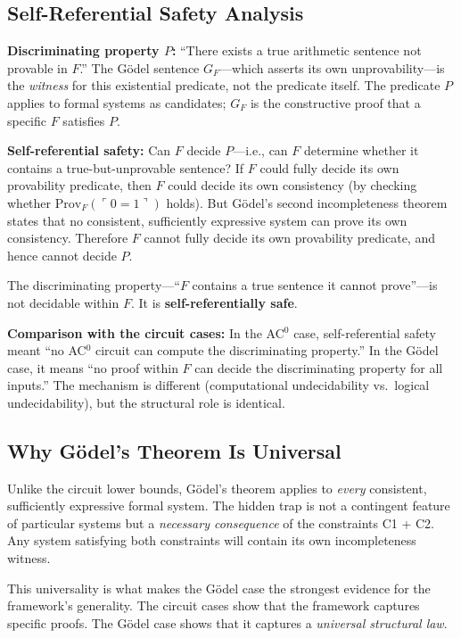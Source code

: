 \documentclass[11pt,a4paper]{article}
\theoremstyle{plain}
\theoremstyle{definition}
\theoremstyle{remark}
\newcommand{\Prov}{\mathrm{Prov}}
\begin{document}
\subsection{Self-Referential Safety Analysis}

\textbf{Discriminating property $P$:} ``There exists a true arithmetic sentence not provable in $F$.'' The G\"{o}del sentence $G_F$---which asserts its own unprovability---is the \emph{witness} for this existential predicate, not the predicate itself. The predicate $P$ applies to formal systems as candidates; $G_F$ is the constructive proof that a specific $F$ satisfies $P$.

\textbf{Self-referential safety:} Can $F$ decide $P$---i.e., can $F$ determine whether it contains a true-but-unprovable sentence? If $F$ could fully decide its own provability predicate, then $F$ could decide its own consistency (by checking whether $\Prov_F(\ulcorner 0=1 \urcorner)$ holds). But G\"{o}del's second incompleteness theorem states that no consistent, sufficiently expressive system can prove its own consistency. Therefore $F$ cannot fully decide its own provability predicate, and hence cannot decide $P$.

The discriminating property---``$F$ contains a true sentence it cannot prove''---is not decidable within $F$. It is \textbf{self-referentially safe}.

\textbf{Comparison with the circuit cases:} In the AC$^0$ case, self-referential safety meant ``no AC$^0$ circuit can compute the discriminating property.'' In the G\"{o}del case, it means ``no proof within $F$ can decide the discriminating property for all inputs.'' The mechanism is different (computational undecidability vs.\ logical undecidability), but the structural role is identical.

\subsection{Why G\"{o}del's Theorem Is Universal}

Unlike the circuit lower bounds, G\"{o}del's theorem applies to \emph{every} consistent, sufficiently expressive formal system. The hidden trap is not a contingent feature of particular systems but a \emph{necessary consequence} of the constraints C1 + C2. Any system satisfying both constraints will contain its own incompleteness witness.

This universality is what makes the G\"{o}del case the strongest evidence for the framework's generality. The circuit cases show that the framework captures specific proofs. The G\"{o}del case shows that it captures a \emph{universal structural law}.
\end{document}
